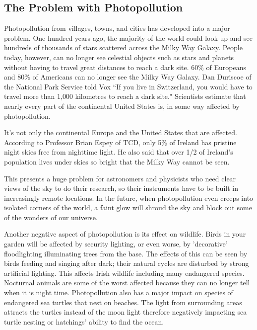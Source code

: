 \subsection{The Problem with Photopollution}
Photopollution from villages, towns, and cities has developed into a major problem. One hundred years ago, the majority of the world could look up and see hundreds of thousands of stars scattered across the Milky Way Galaxy. People today, however, can no longer see celestial objects such as stars and planets without having to travel great distances to reach a dark site. 60\% of Europeans and 80\% of Americans can no longer see the Milky Way Galaxy. Dan Duriscoe of the National Park Service told Vox ``If you live in Switzerland, you would have to travel more than 1,000 kilometres to reach a dark site." Scientists estimate that nearly every part of the continental United States is, in some way affected by photopollution.\cite{vox}

It’s not only the continental Europe and the United States that are affected. According to Professor Brian Espey of TCD, only 5\% of Ireland has pristine night skies free from nighttime light. He also said that over 1/2 of Ireland’s population lives under skies so bright that the Milky Way cannot be seen.\cite{irishtimes}

This presents a huge problem for astronomers and physicists who need clear views of the sky to do their research, so their instruments have to be built in increasingly remote locations. In the future, when  photopollution even creeps into isolated corners of the world, a faint glow will shroud the sky and block out some of the wonders of our universe.\cite{vox}

Another negative aspect of photopollution is its effect on wildlife. Birds in your garden will be affected by security lighting, or even worse, by 'decorative' floodlighting illuminating trees from the base. The effects of this can be seen by birds feeding and singing after dark; their natural cycles are disturbed by strong artificial lighting.\cite{prob}
This affects Irish wildlife including many endangered species. Nocturnal animals are some of the worst affected because they can no longer tell when it is night time. Photopollution also has a major impact on species of endangered sea turtles that nest on beaches. The light from surrounding areas attracts the turtles instead of the moon light therefore negatively impacting sea turtle nesting or hatchings' ability to find the ocean.\cite{turtles}

